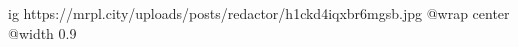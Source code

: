  
 
 
 
 

\ifcmt
  ig https://mrpl.city/uploads/posts/redactor/h1ckd4iqxbr6mgsb.jpg
  @wrap center
  @width 0.9
\fi
